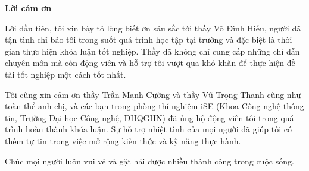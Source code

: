 \begin{center}
\textbf{\large{Lời cảm ơn}	}
\end{center}

Lời đầu tiên, tôi xin bày tỏ lòng biết ơn sâu sắc tới thầy Võ Đình Hiếu, người đã tận tình chỉ bảo tôi trong suốt quá trình học tập tại trường và đặc biệt là thời gian thực hiện khóa luận tốt nghiệp.
Thầy đã không chỉ cung cấp những chỉ dẫn chuyên môn mà còn động viên và hỗ trợ tôi vượt qua khó khăn để thực hiện đề tài tốt nghiệp một cách tốt nhất.

Tôi cũng xin cảm ơn thầy Trần Mạnh Cường và thầy Vũ Trọng Thanh cũng như toàn thể anh chị, và các bạn trong phòng thí nghiệm iSE (Khoa Công nghệ thông tin, Trường Đại học Công nghệ, ĐHQGHN) đã ủng hộ động viên tôi trong quá trình hoàn thành khóa luận.
Sự hỗ trợ nhiệt tình của mọi người đã giúp tôi có thêm tự tin trong việc mở rộng kiến thức và kỹ năng thực hành.

Chúc mọi người luôn vui vẻ và gặt hái được nhiều thành công trong cuộc sống.


